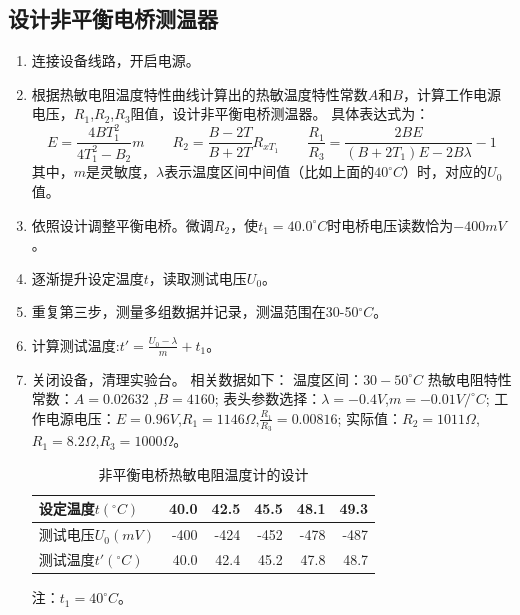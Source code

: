 \documentclass[11pt]{article}
\begin{document}
\subsection{设计非平衡电桥测温器}
\begin{enumerate}
    \item 连接设备线路，开启电源。
    \item 根据热敏电阻温度特性曲线计算出的热敏温度特性常数$A$和$B$，计算工作电源电压，$R_{1}$,$R_{2}$,$R_{3}$阻值，设计非平衡电桥测温器。
    \newline 具体表达式为：\quad
    \[ 
    E=\frac{4BT_{1}^{2}}{4T_{1}^{2}-B_{2}} m 
    \qquad R_{2}=\frac{B-2T}{B+2T} R_{xT_{1}}
    \qquad  \frac{R_{1}}{R_{3}} = \frac{2BE}{(B+2T_{1}) E-2B\lambda} -1
    \]
    其中，$m$是灵敏度，$\lambda$表示温度区间中间值（比如上面的$40^{\circ}C$）时，对应的$U_{0}$值。
    \item 依照设计调整平衡电桥。微调$R_{2}$，使$t_{1}=40.0^{\circ}C$时电桥电压读数恰为$-400mV$。
    \item 逐渐提升设定温度$t$，读取测试电压$U_{0}$。
    \item 重复第三步，测量多组数据并记录，测温范围在30-50$^{\circ}C$。
    \item 计算测试温度:\quad $t'=\frac{U_{0}-\lambda}{m}+t_{1}$。
    \item 关闭设备，清理实验台。
    \newline 相关数据如下：
    \newline 温度区间：$30-50^{\circ}C$ \qquad 
    \newline 热敏电阻特性常数：$A=0.02632$ ,\quad $B=4160$; \qquad 
    \newline 表头参数选择：$\lambda = -0.4V$,\quad $m=-0.01V/^{\circ}C$;\qquad 
    \newline 工作电源电压：$E=0.96V$,\quad $R_{1}=1146\Omega$,\quad $\frac{R_{1}}{R_{3}}=0.00816$;\qquad 
    \newline 实际值：$R_{2}=1011\Omega$,\quad $R_{1}=8.2\Omega$,\quad $R_{3}=1000\Omega$。
        \begin{table}[H]
          \centering
          \caption{非平衡电桥热敏电阻温度计的设计}
            \begin{center}
                \begin{tabular}{|l|r|r|r|r|r|}\hline
                    设定温度$t(^{\circ}C)$ & 40.0  & 42.5  & 45.5  & 48.1  & 49.3  \\\hline
                    测试电压$U_{0}(mV)$ & -400  & -424  & -452  & -478  & -487 \\\hline
                    测试温度$t'(^{\circ}C)$ & 40.0  & 42.4  & 45.2  & 47.8  & 48.7  \\\hline
                \end{tabular}%
            \end{center}
            注：$t_{1}=40^{\circ}C$。
        \end{table}%

\end{enumerate}
\end{document}
